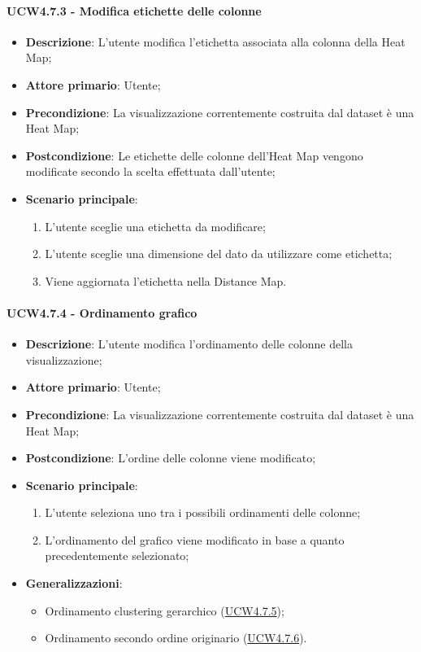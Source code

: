 \paragraph{UCW4.7.3 - Modifica etichette delle colonne}
\label{par:ucw4.7.4}
\begin{itemize}
    \item \textbf{Descrizione}:     L'utente modifica l'etichetta associata alla colonna della Heat Map;
    \item \textbf{Attore primario}: Utente;
    \item \textbf{Precondizione}:   La visualizzazione correntemente costruita dal dataset è una Heat Map;
    \item \textbf{Postcondizione}:  Le etichette delle colonne dell'Heat Map vengono modificate secondo la scelta effettuata dall'utente;
    \item \textbf{Scenario principale}:
    \begin{enumerate}
        \item L'utente sceglie una etichetta da modificare;
        \item L'utente sceglie una dimensione del dato da utilizzare come etichetta;
        \item Viene aggiornata l'etichetta nella Distance Map.
    \end{enumerate}
\end{itemize}

\paragraph{UCW4.7.4 - Ordinamento grafico}
\label{par:ucw4.7.5}
\begin{itemize}
    \item \textbf{Descrizione}:     L'utente modifica l'ordinamento delle colonne della visualizzazione;
    \item \textbf{Attore primario}: Utente;
    \item \textbf{Precondizione}:   La visualizzazione correntemente costruita dal dataset è una Heat Map;
    \item \textbf{Postcondizione}:  L'ordine delle colonne viene modificato;
    \item \textbf{Scenario principale}:
    \begin{enumerate}
        \item L'utente seleziona uno tra i possibili ordinamenti delle colonne;
        \item L'ordinamento del grafico viene modificato in base a quanto precedentemente selezionato;
    \end{enumerate}
    \item \textbf{Generalizzazioni}:
    \begin{itemize}
        \item Ordinamento clustering gerarchico (\hyperref[spar:ucw4.7.5]{UCW4.7.5});
        \item Ordinamento secondo ordine originario (\hyperref[spar:ucw4.7.6]{UCW4.7.6}).
    \end{itemize}
\end{itemize}

